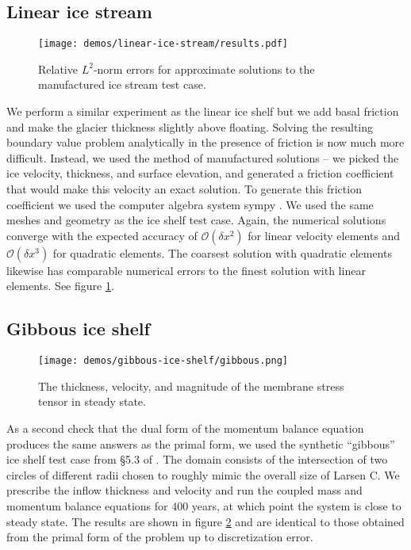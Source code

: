 \documentclass{article}
\theoremstyle{definition}
\theoremstyle{plain}
\begin{document}
\subsection{Linear ice stream} \label{sec:linear-ice-stream}

\begin{figure}[h]
    \begin{center}
        \texttt{[image: demos/linear-ice-stream/results.pdf]}
    \end{center}
    \caption{Relative $L^2$-norm errors for approximate solutions to the manufactured ice stream test case.}
    \label{fig:linear-ice-stream-convergence-rate}
\end{figure}

We perform a similar experiment as the linear ice shelf but we add basal friction and make the glacier thickness slightly above floating.
Solving the resulting boundary value problem analytically in the presence of friction is now much more difficult.
Instead, we used the method of manufactured solutions -- we picked the ice velocity, thickness, and surface elevation, and generated a friction coefficient that would make this velocity an exact solution.
To generate this friction coefficient we used the computer algebra system sympy \citep{sympy}.
We used the same meshes and geometry as the ice shelf test case.
Again, the numerical solutions converge with the expected accuracy of $\mathscr{O}(\delta x^2)$ for linear velocity elements and $\mathscr{O}(\delta x^3)$ for quadratic elements.
The coarsest solution with quadratic elements likewise has comparable numerical errors to the finest solution with linear elements.
See figure \ref{fig:linear-ice-stream-convergence-rate}.

\subsection{Gibbous ice shelf} \label{sec:gibbous-ice-shelf}

\begin{figure}[t]
    \begin{center}
        \texttt{[image: demos/gibbous-ice-shelf/gibbous.png]}
    \end{center}
    \caption{The thickness, velocity, and magnitude of the membrane stress tensor in steady state.}
    \label{fig:gibbous}
\end{figure}

As a second check that the dual form of the momentum balance equation produces the same answers as the primal form, we used the synthetic ``gibbous'' ice shelf test case from \S5.3 of \citet{shapero2021icepack}.
The domain consists of the intersection of two circles of different radii chosen to roughly mimic the overall size of Larsen C.
We prescribe the inflow thickness and velocity and run the coupled mass and momentum balance equations for 400 years, at which point the system is close to steady state.
The results are shown in figure \ref{fig:gibbous} and are identical to those obtained from the primal form of the problem up to discretization error.
\end{document}

